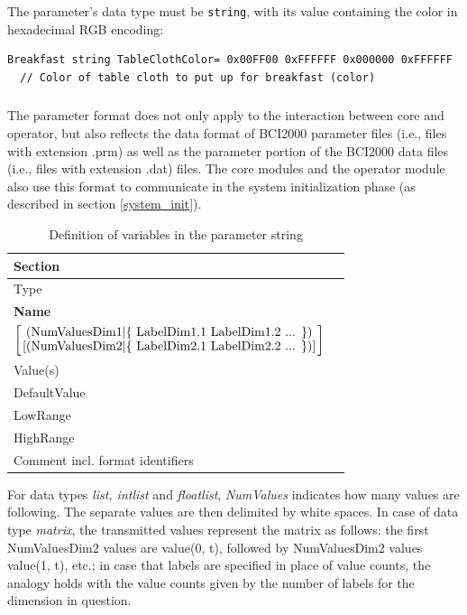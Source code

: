 \documentclass[letterpaper,oneside,12pt]{book}
\begin{document}
The parameter's data type must be \texttt{string}, with its value containing the color
in hexadecimal RGB encoding:
\begin{verbatim}
Breakfast string TableClothColor= 0x00FF00 0xFFFFFF 0x000000 0xFFFFFF
  // Color of table cloth to put up for breakfast (color)
\end{verbatim}

\subsubsection{}
The parameter format does not only apply to the interaction between core and 
operator, but also reflects the data format of BCI2000 parameter files (i.e., 
files with extension .prm) as well as the parameter portion of the BCI2000 data 
files (i.e., files with extension .dat) files. The core modules and the operator 
module also use this format to communicate in the system initialization phase 
(as described in section \ref{system_init}).

\begin{table}[ht]
 \centering
 \begin{tabular}{|l|l|}
  \hline
  Section \\
  \hline
  Type \\
  \hline
  \textbf{Name} \\
  \hline
  ${\left[
    \mbox{(NumValuesDim1$\mid$\{ LabelDim1.1 LabelDim1.2 ... \})}
    \atop
    \mbox{[(NumValuesDim2$\mid$\{ LabelDim2.1 LabelDim2.2 ... \})]}
    \right]}$ \\
  \hline
  Value(s) \\
  \hline
  DefaultValue \\
  \hline
  LowRange \\
  \hline
  HighRange \\
  \hline
  Comment incl. format identifiers \\
  \hline
 \end{tabular}
 \caption{Definition of variables in the parameter string}
 \label{tab:parametervariables}
\end{table}   

For data types \textit{list, intlist} and \textit{floatlist}, \textit{NumValues} 
indicates how many values are following. The separate values are then 
delimited by white spaces. In case of data type \textit{matrix}, the transmitted 
values represent the matrix as follows: the first NumValuesDim2 values are 
value(0, t), followed by NumValuesDim2 values value(1, t), etc.; in case that 
labels are specified in place of value counts, the analogy holds with the value 
counts given by the number of labels for the dimension in question.\\
\end{document}
